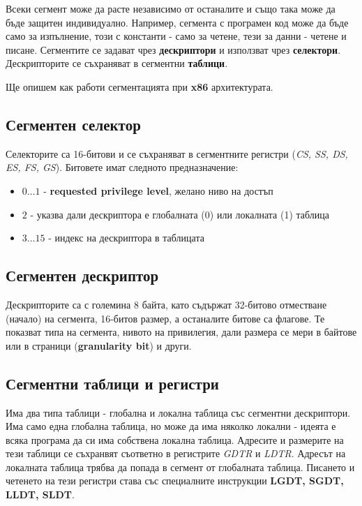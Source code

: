 \documentclass[fleqn,12pt]{article}
\begin{document}
Всеки сегмент може да расте независимо от останалите и също така може да бъде защитен индивидуално. Например, сегмента с програмен код може
да бъде само за изпълнение, този с константи - само за четене, тези за данни - четене и писане. Сегментите се задават чрез \textbf{дескриптори}
и използват чрез \textbf{селектори}. Дескрипторите се съхраняват в сегментни \textbf{таблици}.

Ще опишем как работи сегментацията при \textbf{x86} архитектурата.

\subsection{Сегментен селектор}
Селекторите са 16-битови и се съхраняват в сегментните регистри (\textit{CS, SS, DS, ES, FS, GS}).
Битовете имат следното предназначение:
\begin{itemize}
    \item $0 \dots 1$ - \textbf{requested privilege level}, желано ниво на достъп
    \item $2$ - указва дали дескриптора е глобалната (0) или локалната (1) таблица
    \item $3 \dots 15$ - индекс на дескриптора в таблицата
\end{itemize}

\subsection{Сегментен дескриптор}
Дескрипторите са с големина 8 байта, като съдържат 32-битово отместване (начало) на сегмента, 16-битов размер, а останалите битове са флагове.
Те показват типа на сегмента, нивото на привилегия, дали размера се мери в байтове или в страници (\textbf{granularity bit}) и други.

\subsection{Сегментни таблици и регистри}
Има два типа таблици - глобална и локална таблица със сегментни дескриптори. Има само една глобална таблица, но може да има няколко локални - 
идеята е всяка програма да си има собствена локална таблица. Адресите и размерите на тези таблици се съхранвят съответно в регистрите 
\textit{GDTR} и \textit{LDTR}. Адресът на локалната таблица трябва да попада в сегмент от глобалната таблица.
Писането и четенето на тези регистри става със специалните инструкции \textbf{LGDT, SGDT, LLDT, SLDT}.
\end{document}
